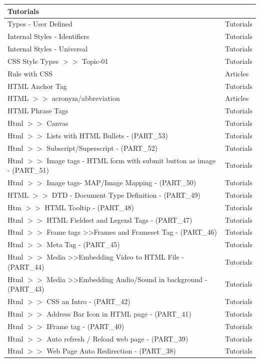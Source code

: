 \documentclass[a4paper, 11pt]{article}
\begin{document}
\begin{longtable}{ |p{12cm}|p{2cm}| }
Tutorials \\
\hline
Types - User Defined
&
Tutorials \\
\hline
Internal Styles - Identifiers
&
Tutorials \\
\hline
Internal Styles - Universal
&
Tutorials \\
\hline
CSS Style Types $>>$ Topic-01
&
Tutorials \\
\hline
Rule with CSS
&
Articles \\
\hline
HTML Anchor Tag
&
Tutorials \\
\hline
HTML $>>$ acronym/abbreviation
&
Articles \\
\hline
HTML Phrase Tags
&
Tutorials \\
\hline
Html $>>$ Canvas
&
Tutorials \\
\hline
Html  $>>$ Lists with HTML Bullets - (PART\_53)
&
Tutorials \\
\hline
Html $>>$  Subscript/Superscript - (PART\_52)
&
Tutorials \\
\hline
Html $>>$  Image tags - HTML form with submit button as image  - (PART\_51)
&
Tutorials \\
\hline
Html $>>$ Image tags- MAP/Image Mapping - (PART\_50)
&
Tutorials \\
\hline
HTML $>>$ DTD - Document Type Definition - (PART\_49)
&
Tutorials \\
\hline
Htm $>>$ HTML Tooltip  - (PART\_48)
&
Tutorials \\
\hline
Html $>>$ HTML Fieldset and Legend Tags  - (PART\_47)
&
Tutorials \\
\hline
Html $>>$ Frame tags >>Frames and Frameset Tag - (PART\_46)
&
Tutorials \\
\hline
Html $>>$ Meta Tag - (PART\_45)
&
Tutorials \\
\hline
Html $>>$ Media >>Embedding Video to HTML File - (PART\_44)
&
Tutorials \\
\hline
Html $>>$ Media >>Embedding Audio/Sound in background - (PART\_43)
&
Tutorials \\
\hline
Html  $>>$ CSS an Intro - (PART\_42)
&
Tutorials \\
\hline
Html  $>>$ Address Bar Icon in HTML page - (PART\_41)
&
Tutorials \\
\hline
Html $>>$ IFrame  tag - (PART\_40)
&
Tutorials \\
\hline
Html  $>>$ Auto refresh / Reload web page - (PART\_39)
&
Tutorials \\
\hline
Html  $>>$ Web Page Auto Redirection - (PART\_38)
&
Tutorials \\

\end{longtable}
\end{document}
